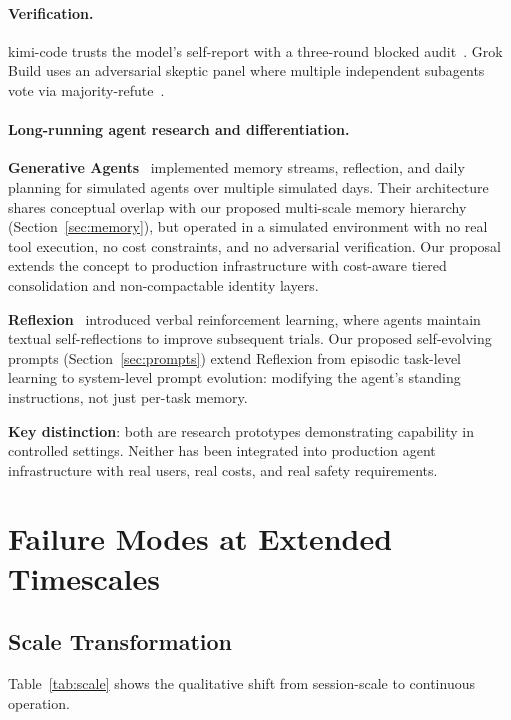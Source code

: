 \documentclass{article}
\begin{document}
\paragraph{Verification.}
kimi-code trusts the model's self-report with a three-round blocked audit~\cite{kimicode_goal}. Grok Build uses an adversarial skeptic panel where multiple independent subagents vote via majority-refute~\cite{grokbuild_skeptic}.

\paragraph{Long-running agent research and differentiation.}
\textbf{Generative Agents}~\cite{park2023generative} implemented memory streams, reflection, and daily planning for simulated agents over multiple simulated days. Their architecture shares conceptual overlap with our proposed multi-scale memory hierarchy (Section~\ref{sec:memory}), but operated in a simulated environment with no real tool execution, no cost constraints, and no adversarial verification. Our proposal extends the concept to production infrastructure with cost-aware tiered consolidation and non-compactable identity layers.

\textbf{Reflexion}~\cite{shinn2023reflexion} introduced verbal reinforcement learning, where agents maintain textual self-reflections to improve subsequent trials. Our proposed self-evolving prompts (Section~\ref{sec:prompts}) extend Reflexion from episodic task-level learning to system-level prompt evolution: modifying the agent's standing instructions, not just per-task memory.

\textbf{Key distinction}: both are research prototypes demonstrating capability in controlled settings. Neither has been integrated into production agent infrastructure with real users, real costs, and real safety requirements.

\section{Failure Modes at Extended Timescales}
\label{sec:failure}

\subsection{Scale Transformation}

Table~\ref{tab:scale} shows the qualitative shift from session-scale to continuous operation.
\end{document}
